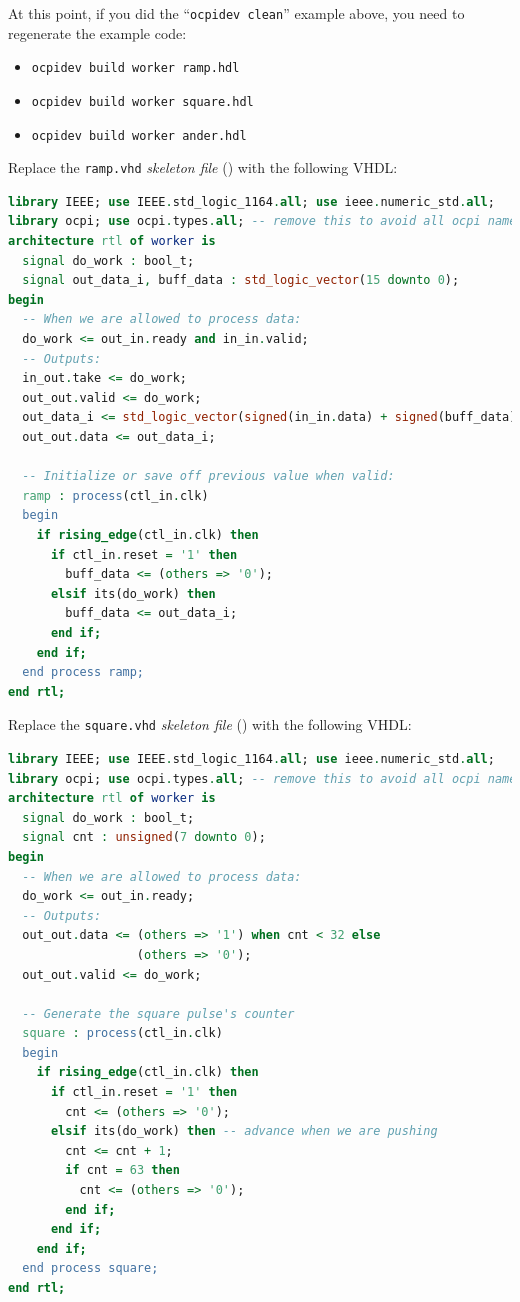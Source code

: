 \bstart
At this point, if you did the ``\texttt{ocpidev clean}'' example above, you need to regenerate the example code:
\begin{itemize}
\setlength\itemsep{0pt}
\item \texttt{ocpidev build worker ramp.hdl}
\item \texttt{ocpidev build worker square.hdl}
\item \texttt{ocpidev build worker ander.hdl}


\end{itemize}
\bend
\bstart
Replace the \verb+ramp.vhd+ \textit{skeleton file} () with the following VHDL:
\begin{lstlisting}[language=vhdl, columns=fullflexible, breaklines=true, prebreak=\textbackslash, basicstyle=\ttfamily, showstringspaces=false, upquote=true]
library IEEE; use IEEE.std_logic_1164.all; use ieee.numeric_std.all;
library ocpi; use ocpi.types.all; -- remove this to avoid all ocpi name collisions
architecture rtl of worker is
  signal do_work : bool_t;
  signal out_data_i, buff_data : std_logic_vector(15 downto 0);
begin
  -- When we are allowed to process data:
  do_work <= out_in.ready and in_in.valid;
  -- Outputs:
  in_out.take <= do_work;
  out_out.valid <= do_work;
  out_data_i <= std_logic_vector(signed(in_in.data) + signed(buff_data));
  out_out.data <= out_data_i;

  -- Initialize or save off previous value when valid:
  ramp : process(ctl_in.clk)
  begin
    if rising_edge(ctl_in.clk) then
      if ctl_in.reset = '1' then
        buff_data <= (others => '0');
      elsif its(do_work) then
        buff_data <= out_data_i;
      end if;
    end if;
  end process ramp;
end rtl;
\end{lstlisting}
\bend
\bstart
Replace the \verb+square.vhd+ \textit{skeleton file} () with the following VHDL:
\begin{lstlisting}[language=vhdl, columns=fullflexible, breaklines=true, prebreak=\textbackslash, basicstyle=\ttfamily, showstringspaces=false, upquote=true]
library IEEE; use IEEE.std_logic_1164.all; use ieee.numeric_std.all;
library ocpi; use ocpi.types.all; -- remove this to avoid all ocpi name collisions
architecture rtl of worker is
  signal do_work : bool_t;
  signal cnt : unsigned(7 downto 0);
begin
  -- When we are allowed to process data:
  do_work <= out_in.ready;
  -- Outputs:
  out_out.data <= (others => '1') when cnt < 32 else
                  (others => '0');
  out_out.valid <= do_work;

  -- Generate the square pulse's counter
  square : process(ctl_in.clk)
  begin
    if rising_edge(ctl_in.clk) then
      if ctl_in.reset = '1' then
        cnt <= (others => '0');
      elsif its(do_work) then -- advance when we are pushing
        cnt <= cnt + 1;
        if cnt = 63 then
          cnt <= (others => '0');
        end if;
      end if;
    end if;
  end process square;
end rtl;
\end{lstlisting}
